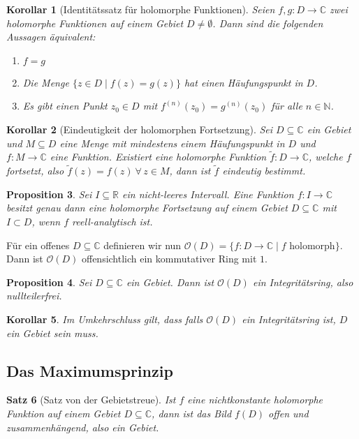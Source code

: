 \documentclass[a4paper,12pt]{article}
\theoremstyle{newthm}
\newtheorem{thm}{Satz}[subsection]
\newtheorem{prop}[thm]{Proposition}
\newtheorem{cor}[thm]{Korollar}
\theoremstyle{newdef}
\theoremstyle{newrem}
\newcommand{\N}{\mathbb{N}}
\newcommand{\R}{\mathbb{R}}
\newcommand{\C}{\mathbb{C}}
\renewcommand{\O}{\mathcal{O}}
\begin{document}
		\begin{cor}[Identitätssatz für holomorphe Funktionen]
			Seien $f,g: D \to \C$ zwei holomorphe Funktionen auf einem Gebiet $ D \neq \emptyset $. Dann sind die folgenden Aussagen äquivalent:
			\begin{enumerate}[label={\roman*})]
				\item $f=g$
				\item Die Menge $ \{z \in D \mid f(z)=g(z)\} $ hat einen Häufungspunkt in $D$.
				\item Es gibt einen Punkt $z_0 \in D$ mit $ f^{(n)}(z_0) = g^{(n)}(z_0) $ für alle $n \in \N$.
			\end{enumerate}
		\end{cor}
		
		\begin{cor}[Eindeutigkeit der holomorphen Fortsetzung]
			Sei $D \subseteq \C$ ein Gebiet und $M \subseteq D$ eine Menge mit mindestens einem Häufungspunkt in $D$ und $f: M \to \C$ eine Funktion. Existiert eine holomorphe Funktion $\tilde{f}: D \to \C$, welche $f$ fortsetzt, also $\tilde{f}(z) = f(z) \ \forall\, z \in M$, dann ist $\tilde{f}$ eindeutig bestimmt.
		\end{cor}
		
		\begin{prop}
			Sei $I \subseteq \R $ ein nicht-leeres Intervall. Eine Funktion $ f: I \to \C $ besitzt genau dann eine holomorphe Fortsetzung auf einem Gebiet $ D \subseteq \C $ mit $ I \subset D $, wenn $f$ reell-analytisch ist.
		\end{prop}
		
		Für ein offenes $D \subseteq \C$ definieren wir nun $ \O(D) = \{ f: D \to \C \mid f $ holomorph$ \} $. Dann ist $ \O(D) $ offensichtlich ein kommutativer Ring mit $1$.
			
		\begin{prop}
			Sei $D \subseteq \C$ ein Gebiet. Dann ist $\O(D)$ ein Integritätsring, also nullteilerfrei.
		\end{prop}
		
		\begin{cor}
			Im Umkehrschluss gilt, dass falls $\O(D)$ ein Integritätsring ist, $D$ ein Gebiet sein muss.
		\end{cor}
		
	
	\subsection{Das Maximumsprinzip}	
		
		\begin{thm}[Satz von der Gebietstreue]\label{2.6.1}
			Ist $f$ eine nichtkonstante holomorphe Funktion auf einem Gebiet $D \subseteq \C$, dann ist das Bild $f(D)$ offen und zusammenhängend, also ein Gebiet.
		\end{thm}
		
\end{document}
